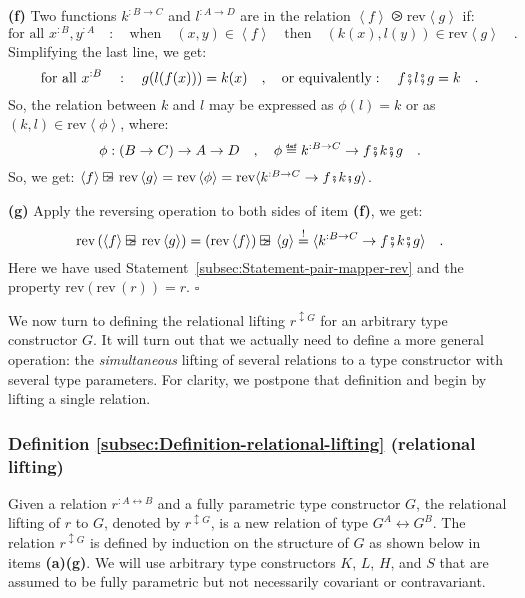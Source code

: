 \textbf{(f)} Two functions $k^{:B\rightarrow C}$ and $l^{:A\rightarrow D}$
are in the relation $\left<f\right>\ogreaterthan\text{rev}\left<g\right>$
if:
\[
\text{for all }x^{:B},y^{:A}\quad:\quad\text{when}\quad(x,y)\in\left<f\right>\quad\text{then}\quad(k(x),l(y))\in\text{rev}\left<g\right>\quad.
\]
Simplifying the last line, we get:
\[
\text{for all }x^{:B}\quad:\quad g(l(f(x)))=k(x)\quad,\quad\text{or equivalently}:\quad f\bef l\bef g=k\quad.
\]
So, the relation between $k$ and $l$ may be expressed as $\phi(l)=k$
or as $(k,l)\in\text{rev}\left<\phi\right>$, where: 
\[
\phi:\left(B\rightarrow C\right)\rightarrow A\rightarrow D\quad,\quad\phi\triangleq k^{:B\rightarrow C}\rightarrow f\bef k\bef g\quad.
\]
So, we get: $\left<f\right>\ogreaterthan\text{rev}\left<g\right>=\text{rev}\left<\phi\right>=\text{rev}\langle k^{:B\rightarrow C}\rightarrow f\bef k\bef g\rangle$.

\textbf{(g)} Apply the reversing operation to both sides of item \textbf{(f)},
we get:
\[
\text{rev}\,(\left<f\right>\ogreaterthan\text{rev}\left<g\right>)=(\text{rev}\left<f\right>)\ogreaterthan\left<g\right>\overset{!}{=}\langle k^{:B\rightarrow C}\rightarrow f\bef k\bef g\rangle\quad.
\]
Here we have used Statement~\ref{subsec:Statement-pair-mapper-rev}
and the property $\text{rev}\left(\text{rev}\,(r)\right)=r$. $\square$

We now turn to defining the relational lifting $r^{\updownarrow G}$
for an arbitrary type constructor $G$. It will turn out that we actually
need to define a more general operation: the \emph{simultaneous} lifting
of several relations to a type constructor with several type parameters.
For clarity, we postpone that definition and begin by lifting a single
relation.

\subsubsection{Definition \label{subsec:Definition-relational-lifting}\ref{subsec:Definition-relational-lifting}
(relational lifting)}

Given a relation $r^{:A\leftrightarrow B}$ and a fully parametric
type constructor $G$, the relational lifting of $r$ to $G$, denoted
by $r^{\updownarrow G}$, is a new relation of type $G^{A}\leftrightarrow G^{B}$.
The relation $r^{\updownarrow G}$ is defined by induction on the
structure of $G$ as shown below in items \textbf{(a)}\textendash \textbf{(g)}.
We will use arbitrary type constructors $K$, $L$, $H$, and $S$
that are assumed to be fully parametric but not necessarily covariant
or contravariant. 


